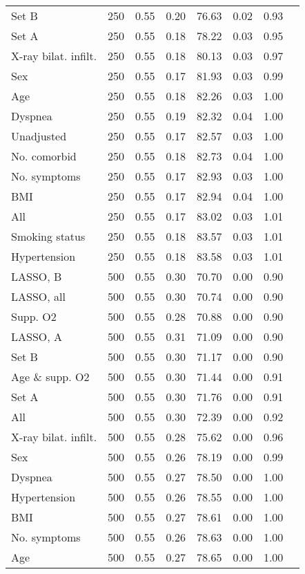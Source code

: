 \documentclass{article}
\begin{document}
{\begin{longtable}{lccccccc}
Set B & 250 & 0.55 & 0.20 & 76.63 & 0.02 & 0.93\\
Set A & 250 & 0.55 & 0.18 & 78.22 & 0.03 & 0.95\\
X-ray bilat. infilt. & 250 & 0.55 & 0.18 & 80.13 & 0.03 & 0.97\\
Sex & 250 & 0.55 & 0.17 & 81.93 & 0.03 & 0.99\\
Age & 250 & 0.55 & 0.18 & 82.26 & 0.03 & 1.00\\
Dyspnea & 250 & 0.55 & 0.19 & 82.32 & 0.04 & 1.00\\
Unadjusted & 250 & 0.55 & 0.17 & 82.57 & 0.03 & 1.00\\
No. comorbid & 250 & 0.55 & 0.18 & 82.73 & 0.04 & 1.00\\
No. symptoms & 250 & 0.55 & 0.17 & 82.93 & 0.03 & 1.00\\
BMI & 250 & 0.55 & 0.17 & 82.94 & 0.04 & 1.00\\
All & 250 & 0.55 & 0.17 & 83.02 & 0.03 & 1.01\\
Smoking status & 250 & 0.55 & 0.18 & 83.57 & 0.03 & 1.01\\
Hypertension & 250 & 0.55 & 0.18 & 83.58 & 0.03 & 1.01\\ \midrule
LASSO, B & 500 & 0.55 & 0.30 & 70.70 & 0.00 & 0.90\\
LASSO, all & 500 & 0.55 & 0.30 & 70.74 & 0.00 & 0.90\\
Supp. O2 & 500 & 0.55 & 0.28 & 70.88 & 0.00 & 0.90\\
LASSO, A & 500 & 0.55 & 0.31 & 71.09 & 0.00 & 0.90\\
Set B & 500 & 0.55 & 0.30 & 71.17 & 0.00 & 0.90\\
Age \& supp. O2 & 500 & 0.55 & 0.30 & 71.44 & 0.00 & 0.91\\
Set A & 500 & 0.55 & 0.30 & 71.76 & 0.00 & 0.91\\
All & 500 & 0.55 & 0.30 & 72.39 & 0.00 & 0.92\\
X-ray bilat. infilt. & 500 & 0.55 & 0.28 & 75.62 & 0.00 & 0.96\\
Sex & 500 & 0.55 & 0.26 & 78.19 & 0.00 & 0.99\\
Dyspnea & 500 & 0.55 & 0.27 & 78.50 & 0.00 & 1.00\\
Hypertension & 500 & 0.55 & 0.26 & 78.55 & 0.00 & 1.00\\
BMI & 500 & 0.55 & 0.27 & 78.61 & 0.00 & 1.00\\
No. symptoms & 500 & 0.55 & 0.26 & 78.63 & 0.00 & 1.00\\
Age & 500 & 0.55 & 0.27 & 78.65 & 0.00 & 1.00\\

\end{longtable}}
\end{document}
